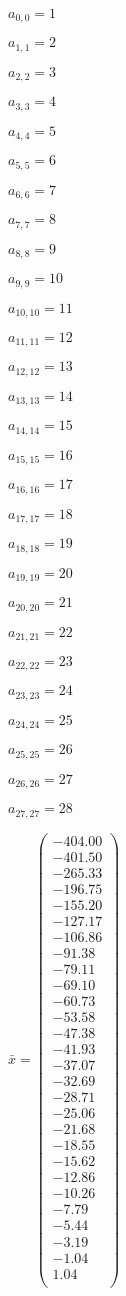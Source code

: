 \documentclass[a4paper,12pt]{article}
\begin{document}
$a _{ 0, 0 } = 1$

$a _{ 1, 1 } = 2$

$a _{ 2, 2 } = 3$

$a _{ 3, 3 } = 4$

$a _{ 4, 4 } = 5$

$a _{ 5, 5 } = 6$

$a _{ 6, 6 } = 7$

$a _{ 7, 7 } = 8$

$a _{ 8, 8 } = 9$

$a _{ 9, 9 } = 10$

$a _{ 10, 10 } = 11$

$a _{ 11, 11 } = 12$

$a _{ 12, 12 } = 13$

$a _{ 13, 13 } = 14$

$a _{ 14, 14 } = 15$

$a _{ 15, 15 } = 16$

$a _{ 16, 16 } = 17$

$a _{ 17, 17 } = 18$

$a _{ 18, 18 } = 19$

$a _{ 19, 19 } = 20$

$a _{ 20, 20 } = 21$

$a _{ 21, 21 } = 22$

$a _{ 22, 22 } = 23$

$a _{ 23, 23 } = 24$

$a _{ 24, 24 } = 25$

$a _{ 25, 25 } = 26$

$a _{ 26, 26 } = 27$

$a _{ 27, 27 } = 28$

$\bar { x } = \begin{pmatrix}
-404.00 \\
-401.50 \\
-265.33 \\
-196.75 \\
-155.20 \\
-127.17 \\
-106.86 \\
-91.38 \\
-79.11 \\
-69.10 \\
-60.73 \\
-53.58 \\
-47.38 \\
-41.93 \\
-37.07 \\
-32.69 \\
-28.71 \\
-25.06 \\
-21.68 \\
-18.55 \\
-15.62 \\
-12.86 \\
-10.26 \\
-7.79 \\
-5.44 \\
-3.19 \\
-1.04 \\
1.04 \\
\end{pmatrix}
$
\end{document}
